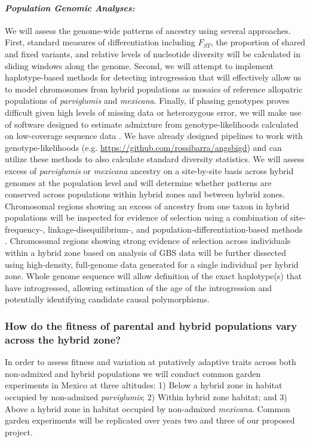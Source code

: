 \paragraph{\emph{Population Genomic Analyses:}} 
We will assess the genome-wide patterns of ancestry using several approaches.  
First, standard measures of differentiation including $F_{ST}$, the proportion of shared and fixed variants, and relative levels of nucleotide diversity \citep{Geneva2014} will be calculated in sliding windows along the genome. 
Second, we will attempt to implement haplotype-based methods for detecting introgression \citep[\emph{e.g.},][]{price2009, lawson2012} that will effectively allow us to model chromosomes from hybrid populations as mosaics of reference allopatric populations of \emph{parviglumis} and \emph{mexicana}.  
Finally, if phasing genotypes \citep{scheet2006fast} proves difficult given high levels of missing data or heterozygous error, we will make use of software designed to estimate admixture from genotype-likelihoods calculated on low-coverage sequence data \citep{skotte2013estimating}. 
We have already designed pipelines to work with genotype-likelihoods (e.g. \url{https://github.com/rossibarra/angsbigd}) and can utilize these methods to also calculate standard diversity statistics.  
We will assess excess of \emph{parviglumis} or \emph{mexicana} ancestry on a site-by-site basis across hybrid genomes at the population level and will determine whether patterns are conserved across populations within hybrid zones and between hybrid zones.  Chromosomal regions showing an excess of ancestry from one taxon in hybrid populations will be inspected for evidence of selection using a combination of site-frequency-, linkage-disequilibrium-, and population-differentiation-based methods \citep[reviewed in][]{Vitti2013}. Chromosomal regions showing strong evidence of selection across individuals within a hybrid zone based on analysis of GBS data will be further dissected using high-density, full-genome data generated for a single individual per hybrid zone.  
Whole genome sequence will allow definition of the exact haplotype(s) that have introgressed, allowing estimation of the age of the introgression and potentially identifying candidate causal polymorphisms.  

\subsubsection{How do the fitness of parental and hybrid populations vary across the hybrid zone?} 
\label{sss:fitness}
In order to assess fitness and variation at putatively adaptive traits across both non-admixed and  hybrid populations we will conduct common garden experiments in Mexico at three altitudes: 1) Below a hybrid zone in habitat occupied by non-admixed \emph{parviglumis}; 2) Within hybrid zone habitat; and 3) Above a hybrid zone in habitat occupied by non-admixed \emph{mexicana}. 
Common garden experiments will be replicated over years two and three of our proposed project.  

